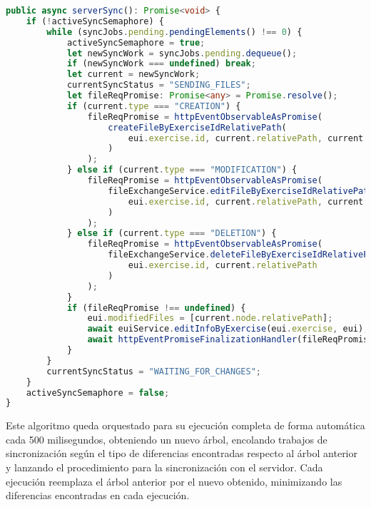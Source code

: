 \begin{lstlisting}[language=TypeScript,caption={Algoritmo que remite trabajos de sincronización al servidor a partir de los contenidos de una cola de prioridad.},label=cod:serverSync]
public async serverSync(): Promise<void> {
    if (!activeSyncSemaphore) {
        while (syncJobs.pending.pendingElements() !== 0) {
            activeSyncSemaphore = true;
            let newSyncWork = syncJobs.pending.dequeue();
            if (newSyncWork === undefined) break;
            let current = newSyncWork;
            currentSyncStatus = "SENDING_FILES";
            let fileReqPromise: Promise<any> = Promise.resolve();
            if (current.type === "CREATION") {
                fileReqPromise = httpEventObservableAsPromise(
                    createFileByExerciseIdRelativePath(
                        eui.exercise.id, current.relativePath, current.fileBlob
                    )
                );
            } else if (current.type === "MODIFICATION") {
                fileReqPromise = httpEventObservableAsPromise(
                    fileExchangeService.editFileByExerciseIdRelativePath(
                        eui.exercise.id, current.relativePath, current.fileBlob
                    )
                );
            } else if (current.type === "DELETION") {
                fileReqPromise = httpEventObservableAsPromise(
                    fileExchangeService.deleteFileByExerciseIdRelativePath(
                        eui.exercise.id, current.relativePath
                    )
                );
            }
            if (fileReqPromise !== undefined) {
                eui.modifiedFiles = [current.node.relativePath];
                await euiService.editInfoByExercise(eui.exercise, eui);
                await httpEventPromiseFinalizationHandler(fileReqPromise);
            }
        }
        currentSyncStatus = "WAITING_FOR_CHANGES";
    }
    activeSyncSemaphore = false;
}
\end{lstlisting}

Este algoritmo queda orquestado para su ejecución completa de forma automática cada 500 milisegundos, obteniendo un nuevo árbol, encolando trabajos de sincronización según el tipo de diferencias encontradas respecto al árbol anterior y lanzando el procedimiento para la sincronización con el servidor. Cada ejecución reemplaza el árbol anterior por el nuevo obtenido, minimizando las diferencias encontradas en cada ejecución.
